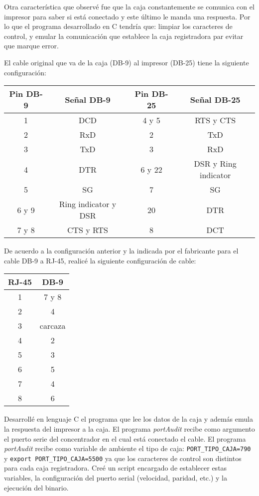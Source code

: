 Otra característica que observé fue que la caja constantemente se comunica con el impresor para saber si está conectado y este último le manda una respuesta. Por lo que el programa desarrollado en C tendría que: limpiar los caracteres de control, y emular la comunicación que establece la caja registradora par evitar que marque error.

El cable original que va de la caja (DB-9) al impresor (DB-25) tiene la siguiente configuración:

\begin{center}
  \begin{tabular}{|c|c|c|c|}
   \hline
   Pin DB-9 & Señal DB-9 & Pin DB-25 & Señal DB-25 \\
   \hline
   1 &  DCD & 4 y 5 & RTS y CTS \\
   \hline
   2 & RxD & 2 & TxD \\
   \hline
   3 & TxD & 3 & RxD \\
   \hline
   4 & DTR & 6 y 22 & DSR y Ring indicator \\
   \hline
   5 & SG & 7 & SG \\
   \hline
   6 y 9 & Ring indicator y DSR & 20 & DTR \\
   \hline
   7 y 8 & CTS y RTS & 8 & DCT \\
   \hline
  \end{tabular}
\end{center}

De acuerdo a la configuración anterior y la indicada por el fabricante para el cable DB-9 a RJ-45, realicé la siguiente configuración de cable:

\begin{center}
 \begin{tabular}{|c|c|}
  \hline
  RJ-45 & DB-9 \\
  \hline
  1 & 7 y 8 \\
  \hline
  2 & 4 \\
  \hline
  3 & carcaza \\
  \hline
  4 & 2 \\
  \hline
  5 & 3 \\
  \hline
  6 & 5 \\
  \hline
  7 & 4 \\
  \hline
  8 & 6 \\
  \hline
 \end{tabular}
\end{center}

Desarrollé en lenguaje C el programa que lee los datos de la caja y además emula la respuesta del impresor a la caja. El programa \textit{portAudit} recibe como argumento el puerto serie del concentrador en el cual está conectado el cable. El programa \textit{portAudit} recibe como variable de ambiente el tipo de caja: \texttt{PORT\_TIPO\_CAJA=790} y \texttt{export PORT\_TIPO\_CAJA=5500} ya que los caracteres de control son distintos para cada caja registradora. Creé un script encargado de establecer estas variables, la configuración del puerto serial (velocidad, paridad, etc.) y la ejecución del binario.

